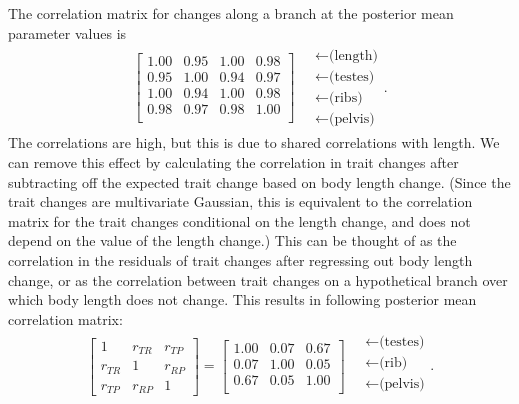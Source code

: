 \documentclass[12pt]{article}
\begin{document}
The correlation matrix for changes along a branch at the posterior mean parameter values is 
\begin{align}
\begin{bmatrix}
   1.00 & 0.95 & 1.00 & 0.98 \\ 
   0.95 & 1.00 & 0.94 & 0.97 \\ 
   1.00 & 0.94 & 1.00 & 0.98 \\ 
   0.98 & 0.97 & 0.98 & 1.00 \\ 
 \end{bmatrix}
\quad \begin{matrix}
  \leftarrow \text{(length)} \\
  \leftarrow \text{(testes)} \\
  \leftarrow \text{(ribs)} \\
  \leftarrow \text{(pelvis)} 
\end{matrix} .
\end{align}
The correlations are high, but this is due to shared correlations with length.
We can remove this effect by calculating the correlation in trait changes
after subtracting off the expected trait change based on body length change.
(Since the trait changes are multivariate Gaussian, this is equivalent to the correlation matrix
for the trait changes conditional on the length change,
and does not depend on the value of the length change.)
This can be thought of as the correlation in the residuals of trait changes after regressing out body length change,
or as the correlation between trait changes on a hypothetical branch over which body length does not change.
This results in following posterior mean correlation matrix:
\begin{align}
\begin{bmatrix}
  1 & r_{TR} & r_{TP} \\ 
  r_{TR} & 1 & r_{RP} \\ 
  r_{TP} & r_{RP} & 1 
 \end{bmatrix}
 =
\begin{bmatrix}
  1.00 & 0.07 & 0.67 \\ 
  0.07 & 1.00 & 0.05 \\ 
  0.67 & 0.05 & 1.00 \\ 
 \end{bmatrix}
\quad \begin{matrix}
  \leftarrow \text{(testes)} \\
  \leftarrow \text{(rib)} \\
  \leftarrow \text{(pelvis)} \\
\end{matrix}  .
\end{align}
\end{document}
